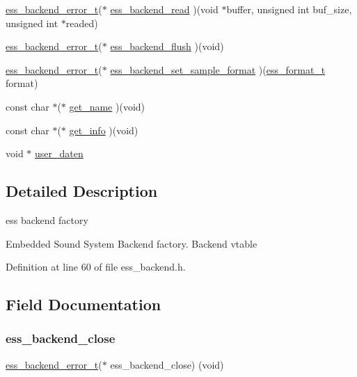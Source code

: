 \begin{DoxyCompactItemize}
\hyperlink{ess__backend_8h_aa3de0496a3f361a6b38684e9cb65f01c}{ess\+\_\+backend\+\_\+error\+\_\+t}($\ast$ \hyperlink{structess__backend_ae79b75bd5bc3c4fd9c3b3706eed97bfb}{ess\+\_\+backend\+\_\+read} )(void $\ast$buffer, unsigned int buf\+\_\+size, unsigned int $\ast$readed)
\item 
\hyperlink{ess__backend_8h_aa3de0496a3f361a6b38684e9cb65f01c}{ess\+\_\+backend\+\_\+error\+\_\+t}($\ast$ \hyperlink{structess__backend_ad5f882cfd71495bd8f0dc15540fb7c9a}{ess\+\_\+backend\+\_\+flush} )(void)
\item 
\hyperlink{ess__backend_8h_aa3de0496a3f361a6b38684e9cb65f01c}{ess\+\_\+backend\+\_\+error\+\_\+t}($\ast$ \hyperlink{structess__backend_af8790cbdeabfcdafa015466bdb552ac2}{ess\+\_\+backend\+\_\+set\+\_\+sample\+\_\+format} )(\hyperlink{ess__format_8h_ab03f24cb5d42f4448f713bf1ec178163}{ess\+\_\+format\+\_\+t} format)
\item 
const char $\ast$($\ast$ \hyperlink{structess__backend_a1e8975441f4fbb374da179cc7e8bcbae}{get\+\_\+name} )(void)
\item 
const char $\ast$($\ast$ \hyperlink{structess__backend_a9f29adb0a4cfb608557d26692fa78254}{get\+\_\+info} )(void)
\item 
void $\ast$ \hyperlink{structess__backend_a5ad8569143b4728c7b7f91c53661d8b5}{user\+\_\+daten}
\end{DoxyCompactItemize}


\subsection{Detailed Description}
ess backend factory 

Embedded Sound System Backend factory. Backend vtable 

Definition at line 60 of file ess\+\_\+backend.\+h.



\subsection{Field Documentation}
\mbox{\label{structess__backend_a5bc22e85096f398b542b05d8b1e41308}} 
\subsubsection{\texorpdfstring{ess\+\_\+backend\+\_\+close}{ess\_backend\_close}}
{\footnotesize\ttfamily \hyperlink{ess__backend_8h_aa3de0496a3f361a6b38684e9cb65f01c}{ess\+\_\+backend\+\_\+error\+\_\+t}($\ast$  ess\+\_\+backend\+\_\+close) (void)}

